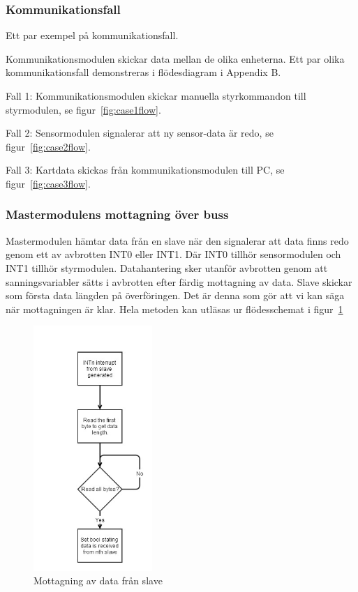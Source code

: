 \documentclass[a4paper,12pt,fleqn]{article}
\begin{document}
\subsubsection{Kommunikationsfall}
Ett par exempel på kom\-mun\-ikations\-fall.

Kommunikationsmodulen skickar data mellan de olika enheterna. Ett par olika kommunikationsfall demonstreras i flödesdiagram i Appendix B.

Fall 1: Kommunikationsmodulen skickar manuella styrkommandon till styrmodulen, se figur~\ref{fig:case1flow}.

Fall 2: Sensormodulen signalerar att ny sensor-data är redo, se  figur~\ref{fig:case2flow}.

Fall 3: Kartdata skickas från kommunikationsmodulen till PC, se figur~\ref{fig:case3flow}. 
 


\subsubsection{Mastermodulens mottagning över buss}

Mastermodulen hämtar data från en slave när den signalerar att data finns redo genom ett av avbrotten INT0 eller INT1. Där INT0 tillhör sensormodulen och INT1 tillhör styrmodulen. Datahantering sker utanför avbrotten genom att sanningsvariabler sätts i avbrotten efter färdig mottagning av data.
Slave skickar som första data längden på överföringen. Det är denna som gör att vi kan säga när mottagningen är klar. Hela metoden kan utläsas ur flödesschemat i figur~\ref{fig:spimaster}

\begin{figure}[htp] %
  \begin{center}
  \includegraphics[keepaspectratio=true,width=0.4\textwidth]{bilder/masterinterrupt.jpg}  %
  \end{center}
  \caption{Mottagning av data från slave} %
  \label{fig:spimaster}
\end{figure}
\end{document}
